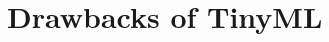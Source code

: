 \documentclass[../main]{subfiles}
\begin{document}
\chapter{Drawbacks of TinyML} \label{chp:}




\end{document}
